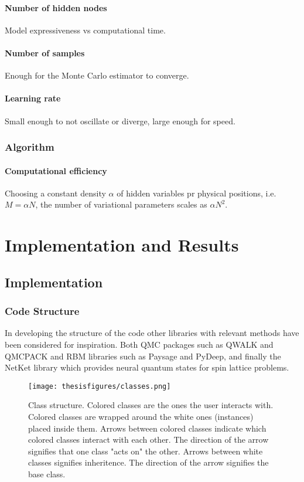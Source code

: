 \documentclass[twoside,english]{uiofysmaster}
\begin{document}
\subsection{Number of hidden nodes}
Model expressiveness vs computational time.
\subsection{Number of samples}
Enough for the Monte Carlo estimator to converge.

\subsection{Learning rate}
Small enough to not oscillate or diverge, large enough for speed.

\section{Algorithm}
\subsection{Computational efficiency}
Choosing a constant density $\alpha$ of hidden variables pr physical positions, i.e. $M=\alpha N$, the number of variational parameters scales as $\alpha N^2$.




\part{Implementation and Results}
\chapter{Implementation}
\section{Code Structure}
In developing the structure of the code other libraries with relevant methods have been considered for inspiration. Both QMC packages such as QWALK and QMCPACK and RBM libraries such as Paysage and PyDeep, and finally the NetKet library which provides neural quantum states for spin lattice problems. 



\begin{figure}
\centering
 \texttt{[image: thesisfigures/classes.png]}
 \caption{Class structure. Colored classes are the ones the user interacts with. Colored classes are wrapped around the white ones (instances) placed inside them. Arrows between colored classes indicate which colored classes interact with each other. The direction of the arrow signifies that one class "acts on" the other. Arrows between white classes signifies inheritence. The direction of the arrow signifies the base class.}
 \label{fig:classes}
\end{figure}
\end{document}
